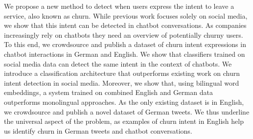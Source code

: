 We propose a new method to detect when users express the intent to leave a service, also known as churn. While previous work focuses solely on social media, we show that this intent can be detected in chatbot conversations. As companies increasingly rely on chatbots they need an overview of potentially churny users. To this end, we crowdsource and publish a dataset of churn intent expressions in chatbot interactions in German and English. We show that classifiers trained on social media data can detect the same intent in the context of chatbots. We introduce a classification architecture that outperforms existing work on churn intent detection in social media. Moreover, we show that, using bilingual word embeddings, a system trained on combined English and German data outperforms monolingual approaches. As the only existing dataset is in English, we crowdsource and publish a novel dataset of German tweets. We thus underline the universal aspect of the problem, as examples of churn intent in English help us identify churn in German tweets and chatbot conversations.
